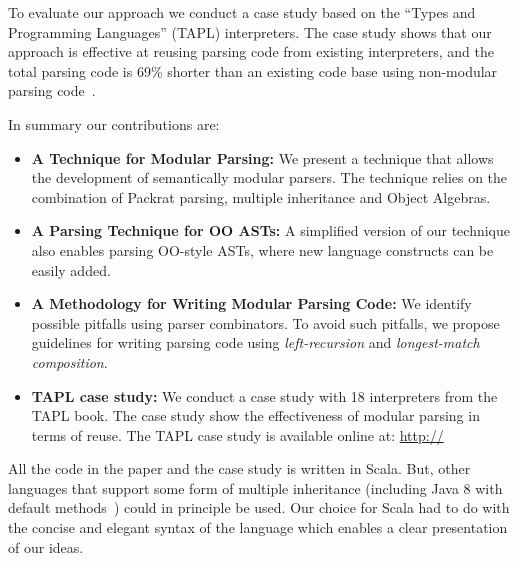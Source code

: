 \begin{comment}
  By analising the \emph{full} grammar it is possible to remove
  backtracking, which would otherwise increase parsing times. Many
  parsing combinator libraries routinely use backtracting elimination
  to achieve performance. However, in a modular setting this technique
  cannot be used, because the full grammar is not known. Thus we have
  to be very conservative at eliminating backtracting. Unfortunatelly,
  this has a severe impact on performance.
\end{comment}

To evaluate our approach we conduct a case study based on the ``Types
and Programming Languages'' (TAPL) interpreters. The case study shows
that our approach is effective at reusing parsing code from existing
interpreters, and the total parsing code is 69\% shorter than an
existing code base using non-modular parsing code~\cite{}.

In summary our contributions are:

\begin{itemize}

\item {{\bf A Technique for Modular Parsing:}} We present a technique
that allows the development of semantically modular parsers.
The technique relies on the combination of Packrat parsing, multiple inheritance
  and Object Algebras.

\item {{\bf A Parsing Technique for OO ASTs:}} A simplified version of
  our technique also enables parsing OO-style ASTs, where new language
  constructs can be easily added.

\item {{\bf A Methodology for Writing Modular Parsing Code:}} We
  identify possible pitfalls using parser combinators. To avoid such
  pitfalls, we propose guidelines for writing parsing code using
  \emph{left-recursion} and \emph{longest-match composition}.

\item {{\bf TAPL case study:}} We conduct a case study with 18 interpreters
  from the TAPL book. The case study show the effectiveness of modular
  parsing in terms of reuse. The TAPL case study is available online
  at:
  \url{http://}

\end{itemize}

All the code in the paper and the case study is written in Scala. But,
other languages that support some form of multiple inheritance
(including Java 8 with default methods~\cite{}) could in principle be
used. Our choice for Scala had to do with the concise and elegant syntax
of the language which enables a clear presentation of our ideas.

